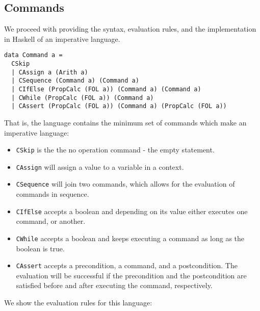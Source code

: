 \documentclass{article}
\begin{document}
\subsection{Commands}

We proceed with providing the syntax, evaluation rules, and the implementation in Haskell of an imperative language.

\begin{lstlisting}
data Command a =
  CSkip
  | CAssign a (Arith a)
  | CSequence (Command a) (Command a)
  | CIfElse (PropCalc (FOL a)) (Command a) (Command a)
  | CWhile (PropCalc (FOL a)) (Command a)
  | CAssert (PropCalc (FOL a)) (Command a) (PropCalc (FOL a))
\end{lstlisting}

That is, the language contains the minimum set of commands which make an imperative language:

\begin{itemize}
\item \texttt{CSkip} is the the no operation command - the empty statement.
\item \texttt{CAssign} will assign a value to a variable in a context.
\item \texttt{CSequence} will join two commands, which allows for the evaluation of commands in sequence.
\item \texttt{CIfElse} accepts a boolean and depending on its value either executes one command, or another.
\item \texttt{CWhile} accepts a boolean and keeps executing a command as long as the boolean is true.
\item \texttt{CAssert} accepts a precondition, a command, and a postcondition. The evaluation will be successful if the precondition and the postcondition are satisfied before and after executing the command, respectively.
\end{itemize}

We show the evaluation rules for this language:
\end{document}
